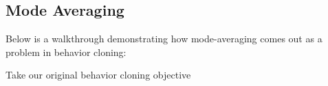 











\subsection{Mode Averaging}
    \large Below is a walkthrough demonstrating how mode-averaging comes out as a problem in behavior cloning: 

    Take our original behavior cloning objective

